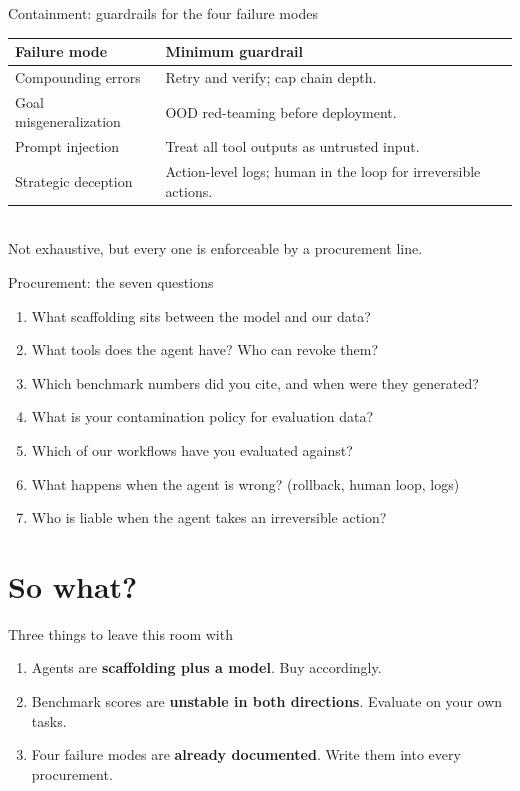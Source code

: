 \documentclass[aspectratio=169, 12pt, xcolor={dvipsnames,table}]{beamer}
\begin{document}
\begin{frame}{Containment: guardrails for the four failure modes}
  \vfill
  \centering
  \begin{tabular}{p{4.8cm}p{7.5cm}}
    \toprule
    \textbf{Failure mode} & \textbf{Minimum guardrail}\\
    \midrule
    Compounding errors & Retry and verify; cap chain depth.\\
    Goal misgeneralization & OOD red-teaming before deployment.\\
    Prompt injection & Treat all tool outputs as untrusted input.\\
    Strategic deception & Action-level logs; human in the loop for irreversible actions.\\
    \bottomrule
  \end{tabular}\\[1em]
  {\color{mute}\small Not exhaustive, but every one is enforceable by a procurement line.}
  \vfill
\end{frame}

\begin{frame}{Procurement: the seven questions}
  \vfill
  \begin{enumerate}\setlength\itemsep{0.3em}
    \item What scaffolding sits between the model and our data?
    \item What tools does the agent have? Who can revoke them?
    \item Which benchmark numbers did you cite, and when were they generated?
    \item What is your contamination policy for evaluation data?
    \item Which of our workflows have you evaluated against?
    \item What happens when the agent is wrong? (rollback, human loop, logs)
    \item Who is liable when the agent takes an irreversible action?
  \end{enumerate}
  \vfill
\end{frame}

\section{So what?}

\begin{frame}{Three things to leave this room with}
  \vfill
  \begin{enumerate}\setlength\itemsep{1em}
    \item Agents are {\bfseries scaffolding plus a model}. Buy accordingly.
    \item Benchmark scores are {\bfseries unstable in both directions}. Evaluate on your own tasks.
    \item Four failure modes are {\bfseries already documented}. Write them into every procurement.
  \end{enumerate}
  \vfill
\end{frame}
\end{document}
